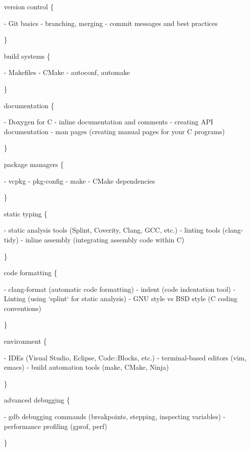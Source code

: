 version control \{ \begin{DoxyVerb}- Git basics
- branching, merging
- commit messages and best practices
\end{DoxyVerb}
 \}

build systems \{ \begin{DoxyVerb}- Makefiles
- CMake
- autoconf, automake
\end{DoxyVerb}
 \}

documentation \{ \begin{DoxyVerb}- Doxygen for C
- inline documentation and comments
- creating API documentation
- man pages (creating manual pages for your C programs)
\end{DoxyVerb}
 \}

package managers \{ \begin{DoxyVerb}- vcpkg
- pkg-config
- make
- CMake dependencies
\end{DoxyVerb}
 \}

static typing \{ \begin{DoxyVerb}- static analysis tools (Splint, Coverity, Clang, GCC, etc.)
- linting tools (clang-tidy)
- inline assembly (integrating assembly code within C)
\end{DoxyVerb}
 \}

code formatting \{ \begin{DoxyVerb}- clang-format (automatic code formatting)
- indent (code indentation tool)
- Linting (using `splint` for static analysis)
- GNU style vs BSD style (C coding conventions)
\end{DoxyVerb}
 \}

environment \{ \begin{DoxyVerb}- IDEs (Visual Studio, Eclipse, Code::Blocks, etc.)
- terminal-based editors (vim, emacs)
- build automation tools (make, CMake, Ninja)
\end{DoxyVerb}
 \}

advanced debugging \{ \begin{DoxyVerb}- gdb debugging commands (breakpoints, stepping, inspecting variables)
- performance profiling (gprof, perf)
\end{DoxyVerb}
 \}

